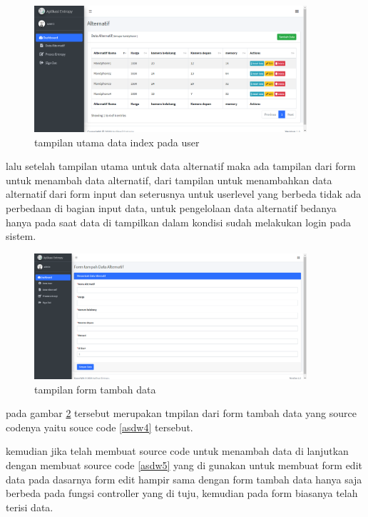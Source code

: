 \begin{figure}[!htbp]
	\centerline{\includegraphics[width=0.90\textwidth]{figures/alt/idx2.png}}
	\caption{tampilan utama data index pada user}
	\label{ve9}
\end{figure}
\pagebreak

lalu setelah tampilan utama untuk data alternatif maka ada tampilan dari form untuk menambah data alternatif, dari tampilan untuk menambahkan data alternatif dari form input dan seterusnya untuk userlevel yang berbeda tidak ada perbedaan di bagian input data, untuk pengelolaan data alternatif bedanya hanya pada saat data di tampilkan dalam kondisi sudah melakukan login pada sistem.\par
\begin{figure}[!htbp]
	\centerline{\includegraphics[width=0.90\textwidth]{figures/alt/add.png}}
	\caption{tampilan form tambah data}
	\label{ve10}
\end{figure}
pada gambar \ref{ve10} tersebut merupakan tmpilan dari form tambah data yang source codenya yaitu souce code \ref{asdw4} tersebut.\par

kemudian jika telah membuat source code untuk menambah data di lanjutkan dengan membuat source code \ref{asdw5} yang di gunakan untuk membuat form edit data pada dasarnya form edit hampir sama dengan form tambah data hanya saja berbeda pada fungsi controller yang di tuju, kemudian pada form biasanya telah terisi data.


